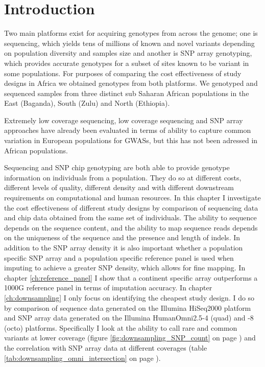 \section{Introduction}
\label{sec:downsampling_introduction}

Two main platforms exist for acquiring genotypes from across the genome; one is sequencing, which yields tens of millions of known and novel variants depending on population diversity and samples size and another is SNP array genotyping, which provides accurate genotypes for a subset of sites known to be variant in some populations. For purposes of comparing the cost effectiveness of study designs in Africa we obtained genotypes from both platforms. We genotyped and sequenced samples from three distinct sub Saharan African populations in the East (Baganda), South (Zulu) and North (Ethiopia).

Extremely low coverage sequencing, low coverage sequencing and SNP array approaches have already been evaluated in terms of ability to capture common variation in European populations for \glspl{GWAS},\cite{Pasaniuc2012}\cite{10.1371/journal.pcbi.1002604} but this has not been adressed in African populations.

Sequencing and \gls{SNP} chip genotyping are both able to provide genotype information on individuals from a population. They do so at different costs, different levels of quality, different density and with different downstream requirements on computational and human resources. In this chapter I investigate the cost effectiveness of different study designs by comparison of sequencing data and chip data obtained from the same set of individuals. The ability to sequence depends on the sequence content, and the ability to map sequence reads depends on the uniqueness of the sequence and the presence and length of indels. In addition to the \gls{SNP} array density it is also important whether a population specific \gls{SNP} array and a population specific reference panel is used when imputing to achieve a greater SNP density, which allows for fine mapping. In chapter \ref{ch:reference_panel} I show that a continent specific array outperforms a 1000G reference panel in terms of imputation accuracy. In chapter \ref{ch:downsampling} I only focus on identifying the cheapest study design. I do so by comparison of sequence data generated on the Illumina HiSeq2000 platform and SNP array data generated on the Illumina HumanOmni2.5-4 (quad) and -8 (octo) platforms. Specifically I look at the ability to call rare and common variants at lower coverage (figure \ref{fig:downsampling_SNP_count} on page \pageref{fig:downsampling_SNP_count}) and the correlation with SNP array data at different coverages (table \ref{tab:downsampling_omni_intersection} on page \pageref{tab:downsampling_omni_intersection}).


